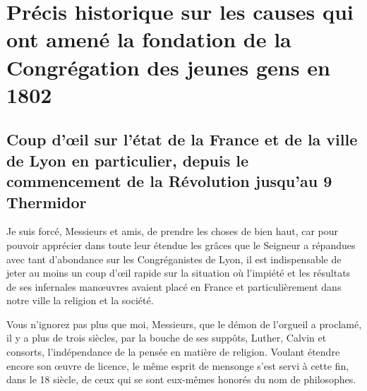 \part*{Précis historique sur les causes qui ont amené la fondation de la Congrégation des jeunes gens en 1802}
\chapter{Coup d'œil sur l'état de la France et de la ville de Lyon en particulier, depuis le commencement de la Révolution jusqu'au 9 Thermidor}

Je suis forcé, Messieurs et amis, de prendre les choses de bien haut, car pour pouvoir apprécier dans toute leur étendue les grâces que le Seigneur a répandues avec tant d'abondance sur les Congréganistes de Lyon, il est indispensable de jeter au moins un coup d'œil rapide sur la situation où l'impiété et les résultats de ses infernales manœuvres avaient placé en France et particulièrement dans notre ville la religion et la société.

Vous n'ignorez pas plus que moi, Messieurs, que le démon de l'orgueil a proclamé, il y a plus de trois siècles, par la bouche de ses suppôts, Luther, Calvin et consorts, l'indépendance de la pensée en matière de religion. Voulant étendre encore son œuvre de licence, le même esprit de mensonge s'est servi à cette fin, dans le 18 siècle, de ceux qui se sont eux-mêmes honorés du nom de philosophes.

